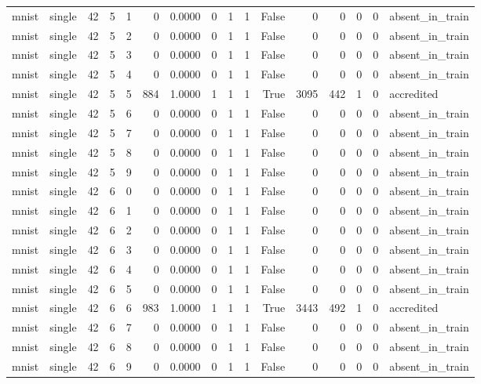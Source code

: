 \begin{tabular}{llrrrrrrrrrrrrrl}
mnist & single & 42 & 5 & 1 & 0 & 0.0000 & 0 & 1 & 1 & False & 0 & 0 & 0 & 0 & absent\_in\_train \\
mnist & single & 42 & 5 & 2 & 0 & 0.0000 & 0 & 1 & 1 & False & 0 & 0 & 0 & 0 & absent\_in\_train \\
mnist & single & 42 & 5 & 3 & 0 & 0.0000 & 0 & 1 & 1 & False & 0 & 0 & 0 & 0 & absent\_in\_train \\
mnist & single & 42 & 5 & 4 & 0 & 0.0000 & 0 & 1 & 1 & False & 0 & 0 & 0 & 0 & absent\_in\_train \\
mnist & single & 42 & 5 & 5 & 884 & 1.0000 & 1 & 1 & 1 & True & 3095 & 442 & 1 & 0 & accredited \\
mnist & single & 42 & 5 & 6 & 0 & 0.0000 & 0 & 1 & 1 & False & 0 & 0 & 0 & 0 & absent\_in\_train \\
mnist & single & 42 & 5 & 7 & 0 & 0.0000 & 0 & 1 & 1 & False & 0 & 0 & 0 & 0 & absent\_in\_train \\
mnist & single & 42 & 5 & 8 & 0 & 0.0000 & 0 & 1 & 1 & False & 0 & 0 & 0 & 0 & absent\_in\_train \\
mnist & single & 42 & 5 & 9 & 0 & 0.0000 & 0 & 1 & 1 & False & 0 & 0 & 0 & 0 & absent\_in\_train \\
mnist & single & 42 & 6 & 0 & 0 & 0.0000 & 0 & 1 & 1 & False & 0 & 0 & 0 & 0 & absent\_in\_train \\
mnist & single & 42 & 6 & 1 & 0 & 0.0000 & 0 & 1 & 1 & False & 0 & 0 & 0 & 0 & absent\_in\_train \\
mnist & single & 42 & 6 & 2 & 0 & 0.0000 & 0 & 1 & 1 & False & 0 & 0 & 0 & 0 & absent\_in\_train \\
mnist & single & 42 & 6 & 3 & 0 & 0.0000 & 0 & 1 & 1 & False & 0 & 0 & 0 & 0 & absent\_in\_train \\
mnist & single & 42 & 6 & 4 & 0 & 0.0000 & 0 & 1 & 1 & False & 0 & 0 & 0 & 0 & absent\_in\_train \\
mnist & single & 42 & 6 & 5 & 0 & 0.0000 & 0 & 1 & 1 & False & 0 & 0 & 0 & 0 & absent\_in\_train \\
mnist & single & 42 & 6 & 6 & 983 & 1.0000 & 1 & 1 & 1 & True & 3443 & 492 & 1 & 0 & accredited \\
mnist & single & 42 & 6 & 7 & 0 & 0.0000 & 0 & 1 & 1 & False & 0 & 0 & 0 & 0 & absent\_in\_train \\
mnist & single & 42 & 6 & 8 & 0 & 0.0000 & 0 & 1 & 1 & False & 0 & 0 & 0 & 0 & absent\_in\_train \\
mnist & single & 42 & 6 & 9 & 0 & 0.0000 & 0 & 1 & 1 & False & 0 & 0 & 0 & 0 & absent\_in\_train \\

\end{tabular}
